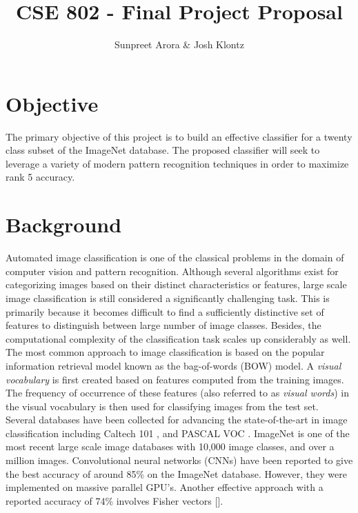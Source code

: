 \documentclass[12pt]{article}
\begin{document}
 
\title{CSE 802 - Final Project Proposal}
\author{Sunpreet Arora \& Josh Klontz\\
}
 
\maketitle

\section{Objective}
The primary objective of this project is to build an effective classifier for a twenty class subset of the ImageNet \cite{imagenet} database. The proposed classifier will seek to leverage a variety of modern pattern recognition techniques in order to maximize rank 5 accuracy.

\section{Background}
Automated image classification is one of the classical problems in the domain of computer vision and pattern recognition. Although several algorithms exist for categorizing images based on their distinct characteristics or features, large scale image classification is still considered a significantly challenging task. This is primarily because it becomes difficult to find a sufficiently distinctive set of features to distinguish between large number of image classes. Besides, the computational complexity of the classification task scales up considerably as well.\\
The most common approach to image classification is based on the popular information retrieval model known as the bag-of-words (BOW) model. A \textit{visual vocabulary} is first created based on features computed from the training images. The frequency of occurrence of these features (also referred to as \textit{visual words}) in the visual vocabulary is then used for classifying images from the test set.\\
Several databases have been collected for advancing the state-of-the-art in image classification including Caltech 101 \cite{caltech101}, and PASCAL VOC \cite{pascal09}. ImageNet\cite{imagenet} is one of the most recent large scale image databases with 10,000 image classes, and over a million images. Convolutional neural networks (CNNs) have been reported to give the best accuracy of around 85\% on the ImageNet database. However, they were implemented on massive parallel GPU's. Another effective approach with a reported accuracy of 74\% involves Fisher vectors [].
\end{document}
